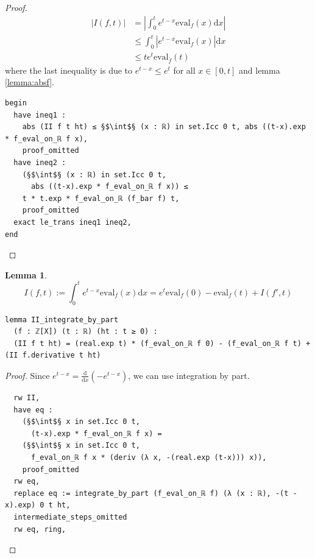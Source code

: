 \documentclass{report}
\theoremstyle{definition}
\newtheorem{lemma}{Lemma}[section]
\begin{document}
\begin{proof}
\begin{equation*}
\begin{aligned}
\left|I(f,t)\right|&=\left|\int_0^te^{t-x}\mathrm{eval}_f(x)\mathrm{d}x\right|\\
                   &\le \int_0^t\left|e^{t-x}\mathrm{eval}_f(x)\right|\mathrm{d}x\\
                   &\le t e^{t}\mathrm{eval}_{\bar f}(t)
\end{aligned}
\end{equation*}
where the last inequality is due to $e^{t-x}\le e^t$ for all $x\in[0,t]$ and lemma \ref{lemma:absf}.
\begin{verbatim}
begin
  have ineq1 :
    abs (II f t ht) ≤ §$\int$§ (x : ℝ) in set.Icc 0 t, abs ((t-x).exp * f_eval_on_ℝ f x),
    proof_omitted
  have ineq2 : 
    (§$\int$§ (x : ℝ) in set.Icc 0 t,
      abs ((t-x).exp * f_eval_on_ℝ f x)) ≤ 
    t * t.exp * f_eval_on_ℝ (f_bar f) t,
    proof_omitted
  exact le_trans ineq1 ineq2,
end
\end{verbatim}
\end{proof}

\begin{lemma}\label{lemma:byPartOnce}
$$
I(f,t):=\int_0^t e^{t-x}\mathrm{eval}_f(x)\mathrm{d}x=e^t\mathrm{eval}_f(0)-\mathrm{eval}_f(t)+I(f', t)
$$
\begin{verbatim}
lemma II_integrate_by_part 
  (f : ℤ[X]) (t : ℝ) (ht : t ≥ 0) : 
  (II f t ht) = (real.exp t) * (f_eval_on_ℝ f 0) - (f_eval_on_ℝ f t) + (II f.derivative t ht)
\end{verbatim}
\end{lemma}

\begin{proof}
Since $e^{t-x}=\frac{\mathrm d}{\mathrm d x}\left(-e^{t-x}\right)$, we can use integration by part.
\begin{verbatim}
  rw II,
  have eq : 
    (§$\int$§ x in set.Icc 0 t,
      (t-x).exp * f_eval_on_ℝ f x) = 
    (§$\int$§ x in set.Icc 0 t,
      f_eval_on_ℝ f x * (deriv (λ x, -(real.exp (t-x))) x)),
    proof_omitted
  rw eq,
  replace eq := integrate_by_part (f_eval_on_ℝ f) (λ (x : ℝ), -(t - x).exp) 0 t ht,
  intermediate_steps_omitted
  rw eq, ring,
\end{verbatim}
\end{proof}
\end{document}
